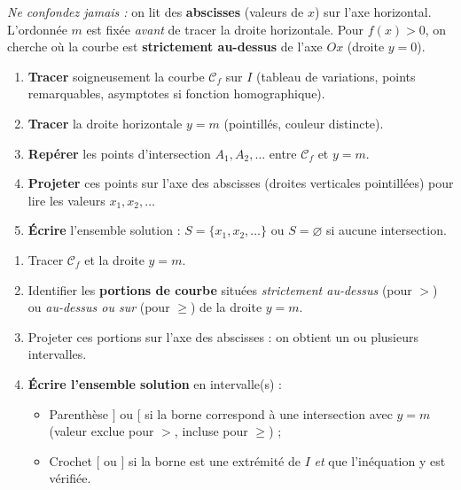 \documentclass[11pt]{article}
\newcounter{popsec}
\newcounter{popsub}
\newcommand{\courssub}[1]{%
  \stepcounter{popsub}%
  \par\vspace{9pt}\noindent{\popxbold\fontsize{11.5}{13}\selectfont\color{popink}{\color{poporange}\thepopsec.\thepopsub}\hspace{6pt}#1}\par\nopagebreak\vspace{4pt}
}
\begin{document}
\begin{attention}
\emph{Ne confondez jamais :} on lit des \textbf{abscisses} (valeurs de $x$) sur l'axe horizontal. L'ordonnée $m$ est fixée \emph{avant} de tracer la droite horizontale. Pour $f(x)>0$, on cherche où la courbe est \textbf{strictement au-dessus} de l'axe $Ox$ (droite $y=0$).
\end{attention}

\courssub{Méthodologie pas à pas}

\begin{methode}[Résolution graphique de $f(x)=m$ sur un intervalle borné $I$]
\begin{enumerate}
\item \textbf{Tracer} soigneusement la courbe $\mathcal{C}_f$ sur $I$ (tableau de variations, points remarquables, asymptotes si fonction homographique).
\item \textbf{Tracer} la droite horizontale $y=m$ (pointillés, couleur distincte).
\item \textbf{Repérer} les points d'intersection $A_1, A_2, \dots$ entre $\mathcal{C}_f$ et $y=m$.
\item \textbf{Projeter} ces points sur l'axe des abscisses (droites verticales pointillées) pour lire les valeurs $x_1, x_2, \dots$
\item \textbf{Écrire} l'ensemble solution : $S=\{x_1, x_2, \dots\}$ ou $S=\varnothing$ si aucune intersection.
\end{enumerate}
\end{methode}

\begin{methode}
\begin{enumerate}
\item Tracer $\mathcal{C}_f$ et la droite $y=m$.
\item Identifier les \textbf{portions de courbe} situées \emph{strictement au-dessus} (pour $>$) ou \emph{au-dessus ou sur} (pour $\ge$) de la droite $y=m$.
\item Projeter ces portions sur l'axe des abscisses : on obtient un ou plusieurs intervalles.
\item \textbf{Écrire l'ensemble solution} en intervalle(s) :
\begin{itemize}
\item Parenthèse $]$ ou $[ $ si la borne correspond à une intersection avec $y=m$ (valeur exclue pour $>$, incluse pour $\ge$) ;
\item Crochet $[$ ou $]$ si la borne est une extrémité de $I$ \emph{et} que l'inéquation y est vérifiée.
\end{itemize}
\end{enumerate}
\end{methode}
\end{document}
